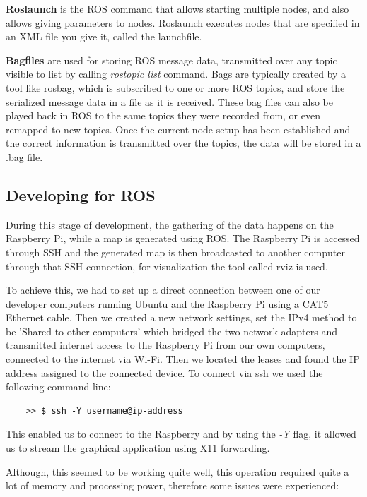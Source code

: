 \textbf{Roslaunch} is the ROS command that allows starting multiple nodes, and also allows giving parameters to nodes. Roslaunch executes nodes that are specified in an XML file you give it, called the launchfile.



\textbf{Bagfiles} are used for storing ROS message data, transmitted over any topic visible to list by calling \textit{rostopic list} command. Bags are typically created by a tool like rosbag, which is subscribed to one or more ROS topics, and store the serialized message data in a file as it is received. These bag files can also be played back in ROS to the same topics they were recorded from, or even remapped to new topics. Once the current node setup has been established and the correct information is transmitted over the topics, the data will be stored in a .bag file.

\subsection{Developing for ROS}
During this stage of development, the gathering of the data happens on the Raspberry Pi, while a map is generated using ROS. The Raspberry Pi is accessed through SSH and the generated map is then broadcasted to another computer through that SSH connection, for visualization the tool called rviz is used. 

To achieve this, we had to set up a direct connection between one of our developer computers running Ubuntu and the Raspberry Pi using a CAT5 Ethernet cable. Then we created a new network settings, set the IPv4 method to be 'Shared to other computers' which bridged the two network adapters and transmitted internet access to the Raspberry Pi from our own computers, connected to the internet via Wi-Fi. Then we located the leases and found the IP address assigned to the connected device. To connect via ssh we used the following command line:
\lstset{language=sh}
\begin{lstlisting}
	>> $ ssh -Y username@ip-address
\end{lstlisting}
This enabled us to connect to the Raspberry and by using the \textit{-Y} flag, it allowed us to stream the graphical application using X11 forwarding.

Although, this seemed to be working quite well, this operation required quite a lot of memory and processing power, therefore some issues were experienced:

